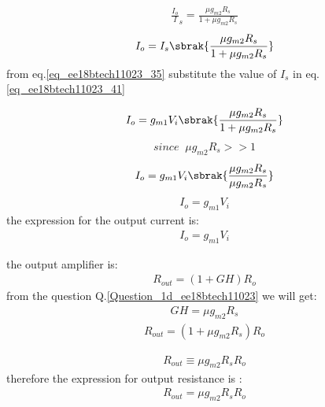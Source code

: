 \begin{enumerate}[label=\thesection.\arabic*.,ref=\thesection.\theenumi]
\begin{align}
    \frac{I_o}I_s{}  = \frac{\mu g_{m2}R_s}{1 + \mu g_{m2}R_s}
    \label{eq_ee18btech11023_40}
\end{align}
\begin{align}
    I_o = I_s\sbrak{\frac{\mu g_{m2}R_s}{1 + \mu g_{m2}R_s}}
      \label{eq_ee18btech11023_41}
\end{align}
from eq.\ref{eq_ee18btech11023_35} substitute the value of $I_s$ in eq.\ref{eq_ee18btech11023_41}

\begin{align}
    I_o =  g_{m1} V_i\sbrak{\frac{\mu g_{m2}R_s}{1 + \mu g_{m2}R_s}}
    \label{eq_ee18btech11023_42}
\end{align}
\begin{align*}
    since\;\; \mu g_{m2}R_s >> 1
\end{align*}
\begin{align}
    I_o =  g_{m1} V_i\sbrak{\frac{\mu g_{m2}R_s}{ \mu g_{m2}R_s}}
    \label{eq_ee18btech11023_43}
\end{align}
\begin{align}
    I_o =  g_{m1} V_i
     \label{eq_ee18btech11023_44}
\end{align}
the expression for the output current is:
\begin{align}
    I_o =  g_{m1} V_i
     \label{eq_ee18btech11023_45}
\end{align}

the output amplifier is:
\begin{align}
    R_{out} = (1 + GH)R_o
    \label{eq_ee18btech11023_46}
\end{align}
from the question  Q.\ref{Question_1d_ee18btech11023} we will get:
\begin{align}
    GH = \mu g_{m2}R_s
    \label{eq_ee18btech11023_47}
\end{align}
\begin{align}
    R_{out} = (1 + \mu g_{m2}R_s)R_o
    \label{eq_ee18btech11023_48}
\end{align}

\begin{align}
    R_{out} \equiv \mu g_{m2}R_s R_o
     \label{eq_ee18btech11023_49}
\end{align}
therefore the expression for output resistance is :
\begin{align}
    R_{out} = \mu g_{m2}R_s R_o
     \label{eq_ee18btech11023_50}
\end{align}
\end{enumerate}
